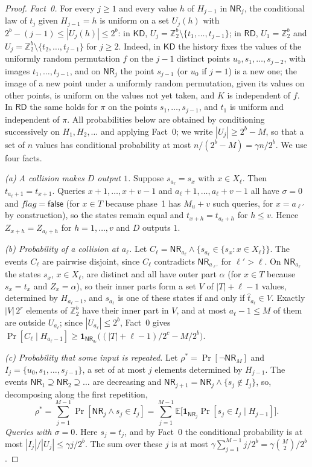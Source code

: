 \documentclass[11pt,a4paper]{article}
\theoremstyle{definition}
\theoremstyle{remark}
\newcommand{\KD}{\mathsf{KD}}
\newcommand{\RD}{\mathsf{RD}}
\newcommand{\flag}{\mathit{flag}}
\newcommand{\false}{\mathsf{false}}
\newcommand{\Z}{\mathbb{Z}}
\newcommand{\E}{\mathbb{E}}
\newcommand{\inp}[1]{\widehat{#1}}
\newcommand{\NR}{\mathsf{NR}}
\begin{document}
\begin{proof}
\emph{Fact~0.} For every $j \ge 1$ and every value $h$ of $H_{j-1}$ in $\NR_j$, the conditional law of $t_j$ given $H_{j-1} = h$ is
uniform on a set $U_j(h)$ with $2^b - (j-1) \le |U_j(h)| \le 2^b$: in $\KD$, $U_j = \Z_2^b \setminus \{t_1, \dots, t_{j-1}\}$; in $\RD$,
$U_1 = \Z_2^b$ and $U_j = \Z_2^b \setminus \{t_2, \dots, t_{j-1}\}$ for $j \ge 2$. Indeed, in $\KD$ the history fixes the values of the
uniformly random permutation $f$ on the $j - 1$ distinct points $u_0, s_1, \dots, s_{j-2}$, with images $t_1, \dots, t_{j-1}$, and
on $\NR_j$ the point $s_{j-1}$ (or $u_0$ if $j = 1$) is a new one; the image of a new point under a uniformly random
permutation, given its values on other points, is uniform on the values not yet taken, and $K$ is independent of $f$.
In $\RD$ the same holds for $\pi$ on the points $s_1, \dots, s_{j-1}$, and $t_1$ is uniform and independent of $\pi$.
All probabilities below are obtained by conditioning successively on $H_1, H_2, \dots$ and applying Fact~0; we write
$|U_j| \ge 2^b - M$, so that a set of $n$ values has conditional probability at most $n/(2^b - M) = \gamma n/2^b$.
We use four facts.

\emph{(a) A collision makes $D$ output $1$.} Suppose $s_{a_\ell} = s_x$ with $x \in X_\ell$. Then $t_{a_\ell+1} = t_{x+1}$.
Queries $x + 1, \dots, x + v - 1$ and $a_\ell + 1, \dots, a_\ell + v - 1$ all have $\sigma = 0$ and $\flag = \false$ (for $x \in T$
because phase~1 has $M_u + v$ such queries, for $x = a_{\ell'}$ by construction), so the states remain equal and
$t_{x+h} = t_{a_\ell+h}$ for $h \le v$. Hence $Z_{x+h} = Z_{a_\ell+h}$ for $h = 1, \dots, v$ and $D$ outputs $1$.

\emph{(b) Probability of a collision at $a_\ell$.} Let $C_\ell = \NR_{a_\ell} \wedge \{ s_{a_\ell} \in \{ s_x : x \in X_\ell \} \}$. The events
$C_\ell$ are pairwise disjoint, since $C_\ell$ contradicts $\NR_{a_{\ell'}}$ for $\ell' > \ell$. On $\NR_{a_\ell}$ the states $s_x$,
$x \in X_\ell$, are distinct and all have outer part $\alpha$ (for $x \in T$ because $s_x = t_x$ and $Z_x = \alpha$), so their inner
parts form a set $V$ of $|T| + \ell - 1$ values, determined by $H_{a_\ell-1}$, and $s_{a_\ell}$ is one of these states if and only if
$\inp{t}_{a_\ell} \in V$. Exactly $|V|\,2^r$ elements of $\Z_2^b$ have their inner part in $V$, and at most $a_\ell - 1 \le M$ of
them are outside $U_{a_\ell}$; since $|U_{a_\ell}| \le 2^b$, Fact~0 gives
$\Pr[C_\ell \mid H_{a_\ell - 1}] \ge \mathbf{1}_{\NR_{a_\ell}}\bigl((|T| + \ell - 1)/2^c - M/2^b\bigr)$.

\emph{(c) Probability that some input is repeated.} Let $\rho^* = \Pr[\neg\NR_M]$ and $I_j = \{u_0, s_1, \dots, s_{j-1}\}$, a set of
at most $j$ elements determined by $H_{j-1}$. The events $\NR_1 \supseteq \NR_2 \supseteq \dots$ are decreasing and
$\NR_{j+1} = \NR_j \wedge \{s_j \notin I_j\}$, so, decomposing along the first repetition,
\[ \rho^* = \sum_{j=1}^{M-1} \Pr[\NR_j \wedge s_j \in I_j] = \sum_{j=1}^{M-1} \E\bigl[\mathbf{1}_{\NR_j} \Pr[s_j \in I_j \mid H_{j-1}]\bigr] . \]
\emph{Queries with $\sigma = 0$.} Here $s_j = t_j$, and by Fact~0 the conditional probability is at most
$|I_j|/|U_j| \le \gamma j/2^b$. The sum over these $j$ is at most $\gamma\sum_{j=1}^{M-1} j/2^b = \gamma\binom{M}{2}/2^b$.


\end{proof}
\end{document}
